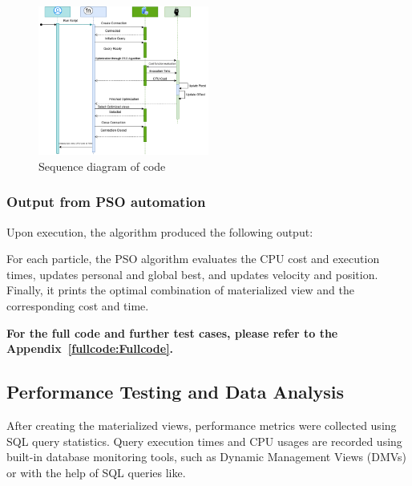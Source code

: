 \clearpage




\begin{figure}[h]
    \centering
    \includegraphics[width=0.5\textwidth]{Figure/seq.diagram .png} %
    \caption{Sequence diagram of code}
    \label{fig:sample_image}
\end{figure}






\subsubsection{Output from PSO automation }  Upon execution, the algorithm produced the following output: \vspace{.4cm}



   \vspace{.4cm}
  






 For each particle, the PSO algorithm evaluates the CPU cost and execution times, updates personal and global best, and updates velocity and position. Finally, it prints the optimal combination of materialized view and the corresponding cost and time.\vspace{.4cm}
  

\textbf{For the full code and further test cases, please refer to the Appendix~\ref{fullcode:Fullcode}.}


\subsection{Performance Testing and Data Analysis} After creating the materialized views, performance metrics were collected using SQL query statistics. Query execution times and CPU usages are recorded using built-in database monitoring tools, such as Dynamic Management Views (DMVs) or with the help of SQL queries like. 

